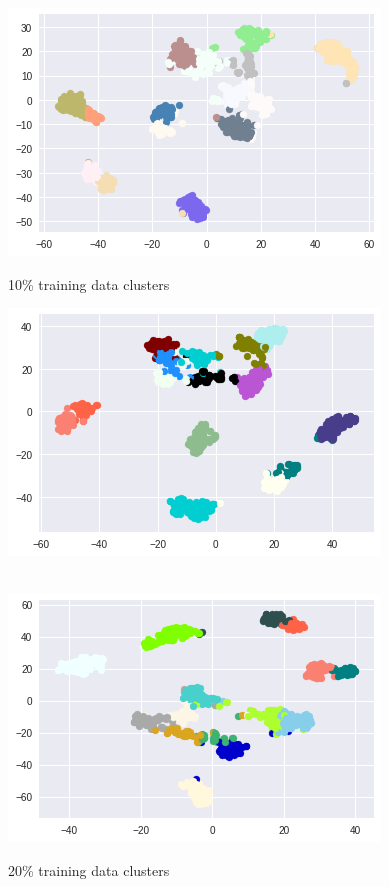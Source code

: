 \documentclass{article}
\begin{document}
\begin{figure}[!htb]
	\includegraphics[width=\linewidth]{../output_plots/FMNIST/clustering/cluster-distribution-10.png}
	\caption{10\% training data clusters}\label{fig:part_1_task_5_cluster_10}
	\endminipage\hfill
	\includegraphics[width=\linewidth]{../output_plots/FMNIST/clustering/cluster-distribution-20.png}
	\caption{20\% training data clusters}\label{fig:part_1_task_5_cluster_20}
	\endminipage\\
	\includegraphics[width=\linewidth]{../output_plots/FMNIST/clustering/cluster-distribution-30.png}

\end{figure}
\end{document}
